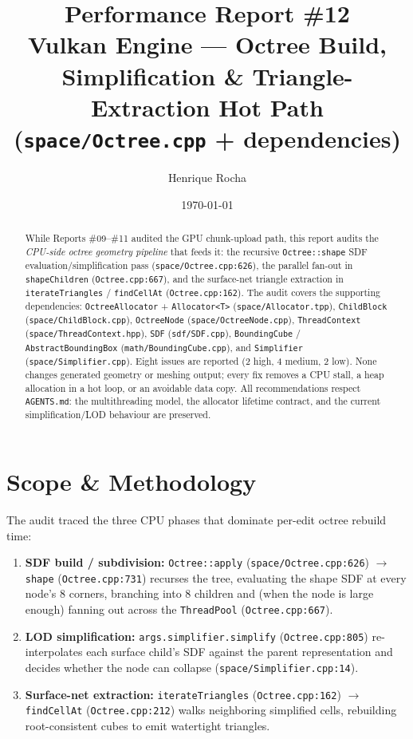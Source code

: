 \documentclass[a4paper,12pt]{article}
\title{\textbf{Performance Report \#12}\\[4pt]
\large Vulkan Engine — Octree Build, Simplification \&
Triangle-Extraction Hot Path (\texttt{space/Octree.cpp} + dependencies)}
\author{Henrique Rocha}
\date{\today}
\begin{document}
\maketitle

\begin{abstract}
While Reports \#09--\#11 audited the GPU chunk-upload path, this report audits the
\emph{CPU-side octree geometry pipeline} that feeds it: the recursive
\texttt{Octree::shape} SDF evaluation/simplification pass (\texttt{space/Octree.cpp:626}),
the parallel fan-out in \texttt{shapeChildren} (\texttt{Octree.cpp:667}), and the
surface-net triangle extraction in \texttt{iterateTriangles} / \texttt{findCellAt}
(\texttt{Octree.cpp:162}). The audit covers the supporting dependencies:
\texttt{OctreeAllocator} + \texttt{Allocator<T>} (\texttt{space/Allocator.tpp}),
\texttt{ChildBlock} (\texttt{space/ChildBlock.cpp}), \texttt{OctreeNode}
(\texttt{space/OctreeNode.cpp}), \texttt{ThreadContext} (\texttt{space/ThreadContext.hpp}),
\texttt{SDF} (\texttt{sdf/SDF.cpp}), \texttt{BoundingCube} /
\texttt{AbstractBoundingBox} (\texttt{math/BoundingCube.cpp}), and
\texttt{Simplifier} (\texttt{space/Simplifier.cpp}).
Eight issues are reported (2 high, 4 medium, 2 low). None changes generated
geometry or meshing output; every fix removes a CPU stall, a heap allocation in a
hot loop, or an avoidable data copy. All recommendations respect \texttt{AGENTS.md}:
the multithreading model, the allocator lifetime contract, and the current
simplification/LOD behaviour are preserved.
\end{abstract}

\tableofcontents
\newpage

\section{Scope \& Methodology}

The audit traced the three CPU phases that dominate per-edit octree rebuild time:

\begin{enumerate}[leftmargin=*]
  \item \textbf{SDF build / subdivision:} \texttt{Octree::apply}
        (\texttt{space/Octree.cpp:626}) $\rightarrow$ \texttt{shape}
        (\texttt{Octree.cpp:731}) recurses the tree, evaluating the shape SDF at
        every node's 8 corners, branching into 8 children and (when the node is
        large enough) fanning out across the \texttt{ThreadPool}
        (\texttt{Octree.cpp:667}).
  \item \textbf{LOD simplification:} \texttt{args.simplifier.simplify}
        (\texttt{Octree.cpp:805}) re-interpolates each surface child's SDF against
        the parent representation and decides whether the node can collapse
        (\texttt{space/Simplifier.cpp:14}).
  \item \textbf{Surface-net extraction:} \texttt{iterateTriangles}
        (\texttt{Octree.cpp:162}) $\rightarrow$ \texttt{findCellAt}
        (\texttt{Octree.cpp:212}) walks neighboring simplified cells, rebuilding
        root-consistent cubes to emit watertight triangles.
\end{enumerate}
\end{document}

